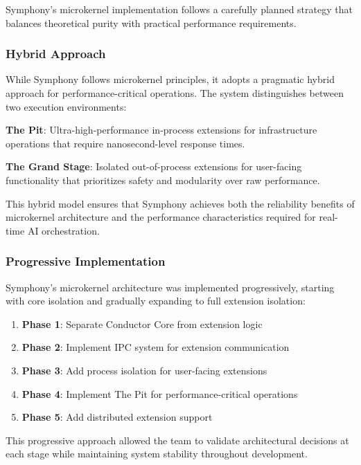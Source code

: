 Symphony's microkernel implementation follows a carefully planned strategy that balances theoretical purity with practical performance requirements.

\subsubsection{Hybrid Approach}

While Symphony follows microkernel principles, it adopts a pragmatic hybrid approach for performance-critical operations. The system distinguishes between two execution environments:

\begin{successbox}
\textbf{The Pit}: Ultra-high-performance in-process extensions for infrastructure operations that require nanosecond-level response times.

\textbf{The Grand Stage}: Isolated out-of-process extensions for user-facing functionality that prioritizes safety and modularity over raw performance.
\end{successbox}

This hybrid model ensures that Symphony achieves both the reliability benefits of microkernel architecture and the performance characteristics required for real-time AI orchestration.

\subsubsection{Progressive Implementation}

Symphony's microkernel architecture was implemented progressively, starting with core isolation and gradually expanding to full extension isolation:

\begin{enumerate}
    \item \textbf{Phase 1}: Separate Conductor Core from extension logic
    \item \textbf{Phase 2}: Implement IPC system for extension communication
    \item \textbf{Phase 3}: Add process isolation for user-facing extensions
    \item \textbf{Phase 4}: Implement The Pit for performance-critical operations
    \item \textbf{Phase 5}: Add distributed extension support
\end{enumerate}

This progressive approach allowed the team to validate architectural decisions at each stage while maintaining system stability throughout development.

